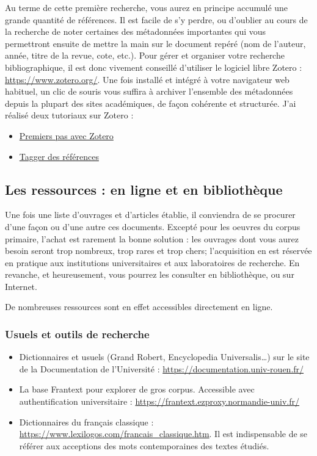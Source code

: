 \documentclass[12pt,twoside,final,openright]{book}
\begin{document}
Au terme de cette première recherche, vous aurez en principe accumulé une grande quantité de références. Il est facile de s’y perdre, ou d’oublier au cours de la recherche de noter certaines des métadonnées importantes qui vous permettront ensuite de mettre la main sur le document repéré (nom de l’auteur, année, titre de la revue, cote, etc.). Pour gérer et organiser votre recherche bibliographique, il est donc vivement conseillé d’utiliser le logiciel libre Zotero : \url{https://www.zotero.org/}. Une fois installé et intégré à votre navigateur web habituel, un clic de souris vous suffira à archiver l’ensemble des métadonnées depuis la plupart des sites académiques, de façon cohérente et structurée. J’ai réalisé deux tutoriaux sur Zotero :

\begin{itemize}
	\item \href{https://youtu.be/6HwqukdCk3Y}{Premiers pas avec Zotero}
	\item \href{https://youtu.be/xw4vFE-kgUM}{Tagger des références}
\end{itemize}

\subsection{Les ressources : en ligne et en bibliothèque}
Une fois une liste d’ouvrages et d’articles établie, il conviendra de se procurer d’une façon ou d’une autre ces documents. Excepté pour les oeuvres du corpus primaire, l’achat est rarement la bonne solution : les ouvrages dont vous aurez besoin seront trop nombreux, trop rares et trop chers; l’acquisition en est réservée en pratique aux institutions universitaires et aux laboratoires de recherche. En revanche, et heureusement, vous pourrez les consulter en bibliothèque, ou sur Internet.

De nombreuses ressources sont en effet accessibles directement en ligne.

\subsubsection{Usuels et outils de recherche}
\begin{itemize}
	\item Dictionnaires et usuels (Grand Robert, Encyclopedia Universalis…) sur le site de la Documentation de l’Université : \url{https://documentation.univ-rouen.fr/}
	\item La base Frantext pour explorer de gros corpus. Accessible avec authentification universitaire : \url{https://frantext.ezproxy.normandie-univ.fr/} 
	\item Dictionnaires du français classique : \url{https://www.lexilogos.com/francais_classique.htm}. Il est indispensable de se référer aux acceptions des mots contemporaines des textes étudiés.
	
\end{itemize}
\end{document}
